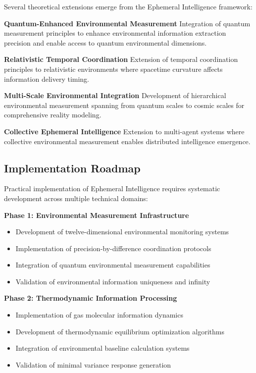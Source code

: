 \documentclass[12pt,a4paper]{article}
\begin{document}
Several theoretical extensions emerge from the Ephemeral Intelligence framework:

\textbf{Quantum-Enhanced Environmental Measurement}
Integration of quantum measurement principles to enhance environmental information extraction precision and enable access to quantum environmental dimensions.

\textbf{Relativistic Temporal Coordination}
Extension of temporal coordination principles to relativistic environments where spacetime curvature affects information delivery timing.

\textbf{Multi-Scale Environmental Integration}
Development of hierarchical environmental measurement spanning from quantum scales to cosmic scales for comprehensive reality modeling.

\textbf{Collective Ephemeral Intelligence}
Extension to multi-agent systems where collective environmental measurement enables distributed intelligence emergence.

\subsection{Implementation Roadmap}

Practical implementation of Ephemeral Intelligence requires systematic development across multiple technical domains:

\textbf{Phase 1: Environmental Measurement Infrastructure}
\begin{itemize}
\item Development of twelve-dimensional environmental monitoring systems
\item Implementation of precision-by-difference coordination protocols
\item Integration of quantum environmental measurement capabilities
\item Validation of environmental information uniqueness and infinity
\end{itemize}

\textbf{Phase 2: Thermodynamic Information Processing}
\begin{itemize}
\item Implementation of gas molecular information dynamics
\item Development of thermodynamic equilibrium optimization algorithms
\item Integration of environmental baseline calculation systems
\item Validation of minimal variance response generation
\end{itemize}
\end{document}
